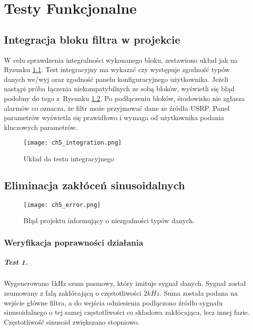 \chapter{Testy Funkcjonalne}
\section{Integracja bloku filtra w projekcie}

W celu sprawdzenia integralności wykonanego bloku, zestawiono układ jak na Rysunku \ref{fig:itest}.
Test integracyjny ma wykazać czy występuje zgodność typów danych we/wyj oraz zgodność panelu konfiguracyjnego użytkownika.
Jeżeli nastąpi próba łączenia niekompatybilnych ze sobą bloków, wyświetli się błąd podobny do tego z~Rysunku \ref{fig:error}.
Po podłączeniu bloków, środowisko nie zgłasza alarmów co oznacza, że filtr może przyjmować dane ze źródła USRP. 
Panel parametrów wyświetla się prawidłowo i wymaga od użytkownika podania kluczowych parametrów.
  
\begin{figure}[ht]
\centering
\texttt{[image: ch5\_integration.png]}
\caption{Układ do testu integracyjnego}
\label{fig:itest}
\end{figure}

\section{Eliminacja zakłóceń sinusoidalnych}

\begin{figure}[ht]
\centering
\texttt{[image: ch5\_error.png]}
\caption{Błąd projektu informujący o niezgodności typów danych.}
\label{fig:error}
\end{figure}
\subsection{Weryfikacja poprawności działania}

\paragraph{Test 1.}
Wygenerowano 1kHz szum pasmowy, który imituje sygnał danych.
Sygnał został zsumowany z falą zakłócającą o częstotliwości $2kHz$.
Suma została podana na wejście główne filtra, a do wejścia odniesienia podłączono źródło sygnału sinusoidalnego o tej samej częstotliwości co składowa zakłócająca, lecz innej fazie.
Częstotliwość sinusoid zwiększano stopniowo.

